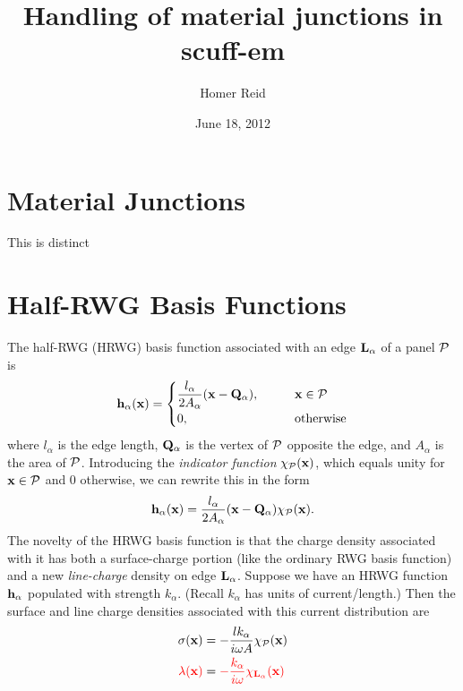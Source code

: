 \documentclass[letterpaper]{article}
\title {Handling of material junctions in {\sc scuff-em}}
\author {Homer Reid}
\date {June 18, 2012}
\begin{document}
\pagestyle{myheadings}
\maketitle

\tableofcontents

\newpage
\section{Material Junctions}

This is distinct 

\newpage
\section{Half-RWG Basis Functions}

The half-RWG (HRWG) basis function associated with 
an edge $\mathbf{L}_\alpha$ of a panel $\mathcal{P}$ is
$$ \mathbf{h}_\alpha(\mathbf{x}) = 
   \begin{cases}
   \displaystyle{ \frac{l_\alpha}{2A_\alpha}(\mathbf{x} - \mathbf{Q}_\alpha)}, 
   \qquad & \mathbf{x} \in \mathcal{P} 
   \\[5pt]
   0, \qquad & \text{otherwise}
   \end{cases}
$$
where $l_\alpha$ is the edge length, $\mathbf{Q}_\alpha$ is 
the vertex of $\mathcal{P}$ opposite the edge, and $A_\alpha$ 
is the area of $\mathcal{P}$.
Introducing the \textit{indicator function} $\chi_{\mathcal{P}}(\mathbf{x})$, 
which equals unity for $\mathbf{x}\in \mathcal{P}$ and 0 otherwise, 
we can rewrite this in the form
$$ \mathbf{h}_\alpha(\mathbf{x}) = 
   \frac{l_\alpha}{2A_\alpha}(\mathbf{x} - \mathbf{Q}_\alpha)\chi_{\mathcal{P}}(\mathbf{x}).
$$
The novelty of the HRWG basis function is that the charge density
associated with it has both a surface-charge portion 
(like the ordinary RWG basis function) and a new \textit{line-charge}
density on edge $\mathbf{L}_\alpha$. Suppose we have an HRWG function
$\mathbf{h}_\alpha$ populated with strength $k_\alpha$. (Recall $k_\alpha$
has units of current/length.) Then the surface and line charge
densities associated with this current distribution are 
\begin{align*}
  \sigma(\mathbf{x})
 &=
 -\frac{lk_\alpha}{i\omega A}\chi_{\mathcal{P}}(\mathbf{x})
\\
\textcolor{red}{ \lambda(\mathbf{x})}
 &=
\textcolor{red}{-\frac{k_\alpha}{i\omega}\chi_{\mathbf{L}_\alpha}(\mathbf{x})}
\end{align*}
\end{document}
